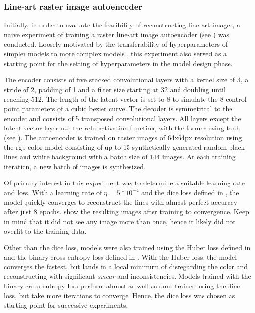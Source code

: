 \subsubsection{Line-art raster image autoencoder}
\label{subsec:early.ae}

Initially, in order to evaluate the feasibility of reconstructing line-art images, a naive experiment of training a raster line-art image autoencoder (see ) was conducted. Loosely motivated by the transferability of hyperparameters of simpler models to more complex models \citep{DBLP:conf/nips/YangHBSLFRPCG21}, this experiment also served as a starting point for the setting of hyperparameters in the model design phase.

The encoder consists of five stacked convolutional layers with a kernel size of 3, a stride of 2, padding of 1 and a filter size starting at 32 and doubling until reaching 512. The length of the latent vector is set to 8 to simulate the 8 control point parameters of a cubic bezier curve. The decoder is symmetrical to the encoder and consists of 5 transposed convolutional layers. All layers except the latent vector layer use the \gls{relu} activation function, with the former using tanh (see ). The autoencoder is trained on raster images of 64x64px resolution using the \gls{rgb} color model consisting of up to 15 synthetically generated random black lines and white background with a batch size of 144 images. At each training iteration, a new batch of images is synthesized.

Of primary interest in this experiment was to determine a suitable learning rate and loss. With a learning rate of $\eta=5*10^{-4}$ and the dice loss defined in , the model quickly converges to reconstruct the lines with almost perfect accuracy after just 8 epochs.  show the resulting images after training to convergence. Keep in mind that it did not see any image more than once, hence it likely did not overfit to the training data.

Other than the dice loss, models were also trained using the Huber loss defined in  and the binary cross-entropy loss defined in . With the Huber loss, the model converges the fastest, but lands in a local minimum of disregarding the color and reconstructing with significant \emph{smear} and inconsistencies. Models trained with the binary cross-entropy loss perform almost as well as ones trained using the dice loss, but take more iterations to converge. Hence, the dice loss was chosen as starting point for successive experiments.


